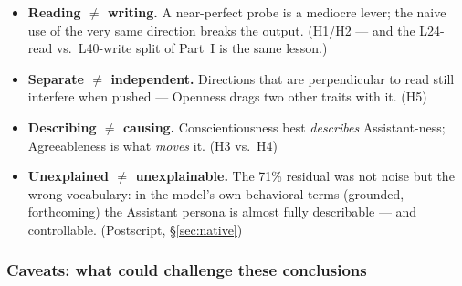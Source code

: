 \documentclass[11pt]{article}
\begin{document}
\begin{itemize}
  \item \textbf{Reading $\neq$ writing.} A near-perfect probe is a mediocre
        lever; the naive use of the very same direction breaks the output.
        (H1/H2 --- and the L24-read vs.\ L40-write split of Part~I is the same
        lesson.)
  \item \textbf{Separate $\neq$ independent.} Directions that are perpendicular
        to read still interfere when pushed --- Openness drags two other traits
        with it. (H5)
  \item \textbf{Describing $\neq$ causing.} Conscientiousness best
        \emph{describes} Assistant-ness; Agreeableness is what \emph{moves} it.
        (H3 vs.\ H4)
  \item \textbf{Unexplained $\neq$ unexplainable.} The 71\% residual was not
        noise but the wrong vocabulary: in the model's own behavioral terms
        (grounded, forthcoming) the Assistant persona is almost fully
        describable --- and controllable. (Postscript, \S\ref{sec:native})
\end{itemize}

\subsubsection{Caveats: what could challenge these conclusions}
\end{document}
